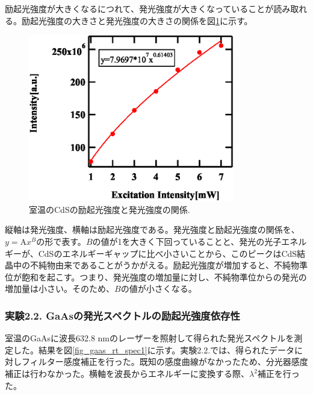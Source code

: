 \documentclass[11pt,a4j]{jsarticle}
\begin{document}

励起光強度が大きくなるにつれて、発光強度が大きくなっていることが読み取れる。励起光強度の大きさと発光強度の大きさの関係を図\ref{fig_cds_imp_int1}に示す。

\newpage

\begin{figure}[ht]
 \centering
 \includegraphics[clip,width=9cm]{start2_CdS_imp_Int.eps}
 \caption{室温のCdSの励起光強度と発光強度の関係.}
 \label{fig_cds_imp_int1}
\end{figure}

縦軸は発光強度、横軸は励起光強度である。発光強度と励起光強度の関係を、$y=\mathrm{A}x^{B}$の形で表す。$B$の値が1を大きく下回っていることと、発光の光子エネルギーが、CdSのエネルギーギャップに比べ小さいことから、このピークはCdS結晶中の不純物由来であることがうかがえる。励起光強度が増加すると、不純物準位が飽和を起こす。つまり、発光強度の増加量に対し、不純物準位からの発光の増加量は小さい。そのため、$B$の値が小さくなる。

\newpage
\subsubsection{実験2.2. GaAsの発光スペクトルの励起光強度依存性}

室温のGaAsに波長632.8 nmのレーザーを照射して得られた発光スペクトルを測定した。結果を図\ref{fig_gaas_rt_spec1}に示す。実験2.2.では、得られたデータに対しフィルター感度補正を行った。既知の感度曲線がなかったため、分光器感度補正は行わなかった。横軸を波長からエネルギーに変換する際、$\lambda^2$補正を行った。
\end{document}
